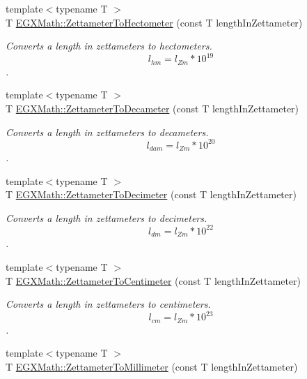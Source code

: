 \begin{DoxyCompactItemize}
{\footnotesize template$<$typename T $>$ }\\T \mbox{\hyperlink{group___e_g_x_math-_conversions-_length_conversions-_s_i-_zettameter-_s_i_gada762e454268ba506fcbf3caae74f14e}{E\+G\+X\+Math\+::\+Zettameter\+To\+Hectometer}} (const T length\+In\+Zettameter)
\begin{DoxyCompactList}\small\item\em Converts a length in zettameters to hectometers. \[ l_{hm}=l_{Zm} * 10^{19} \]. \end{DoxyCompactList}\item 
{\footnotesize template$<$typename T $>$ }\\T \mbox{\hyperlink{group___e_g_x_math-_conversions-_length_conversions-_s_i-_zettameter-_s_i_ga3346f705d6a1e23f103456886cfca420}{E\+G\+X\+Math\+::\+Zettameter\+To\+Decameter}} (const T length\+In\+Zettameter)
\begin{DoxyCompactList}\small\item\em Converts a length in zettameters to decameters. \[ l_{dam}=l_{Zm} * 10^{20} \]. \end{DoxyCompactList}\item 
{\footnotesize template$<$typename T $>$ }\\T \mbox{\hyperlink{group___e_g_x_math-_conversions-_length_conversions-_s_i-_zettameter-_s_i_gadee88d17dc42d5a94ff2bbb0dfe05a71}{E\+G\+X\+Math\+::\+Zettameter\+To\+Decimeter}} (const T length\+In\+Zettameter)
\begin{DoxyCompactList}\small\item\em Converts a length in zettameters to decimeters. \[ l_{dm}=l_{Zm} * 10^{22} \]. \end{DoxyCompactList}\item 
{\footnotesize template$<$typename T $>$ }\\T \mbox{\hyperlink{group___e_g_x_math-_conversions-_length_conversions-_s_i-_zettameter-_s_i_gae555780970b9583ec04265ea8e422e7c}{E\+G\+X\+Math\+::\+Zettameter\+To\+Centimeter}} (const T length\+In\+Zettameter)
\begin{DoxyCompactList}\small\item\em Converts a length in zettameters to centimeters. \[ l_{cm}=l_{Zm} * 10^{23} \]. \end{DoxyCompactList}\item 
{\footnotesize template$<$typename T $>$ }\\T \mbox{\hyperlink{group___e_g_x_math-_conversions-_length_conversions-_s_i-_zettameter-_s_i_ga0a4789d57f14de64a2a3579745c7c5b5}{E\+G\+X\+Math\+::\+Zettameter\+To\+Millimeter}} (const T length\+In\+Zettameter)

\end{DoxyCompactItemize}
